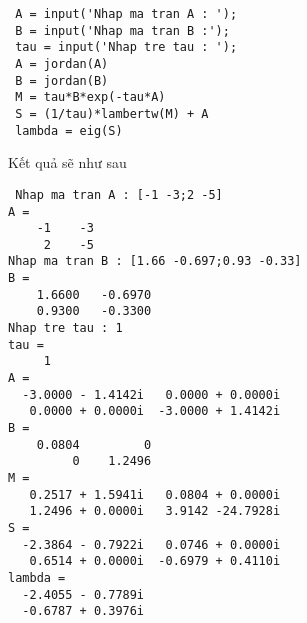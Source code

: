  \begin{verbatim}
 A = input('Nhap ma tran A : ');
 B = input('Nhap ma tran B :');
 tau = input('Nhap tre tau : ');
 A = jordan(A)
 B = jordan(B)
 M = tau*B*exp(-tau*A)
 S = (1/tau)*lambertw(M) + A
 lambda = eig(S)
 \end{verbatim}
 Kết quả sẽ như sau 
 \begin{verbatim}
 Nhap ma tran A : [-1 -3;2 -5]
A =
    -1    -3
     2    -5
Nhap ma tran B : [1.66 -0.697;0.93 -0.33]
B =
    1.6600   -0.6970
    0.9300   -0.3300
Nhap tre tau : 1
tau =
     1
A =
  -3.0000 - 1.4142i   0.0000 + 0.0000i
   0.0000 + 0.0000i  -3.0000 + 1.4142i
B =
    0.0804         0
         0    1.2496
M =
   0.2517 + 1.5941i   0.0804 + 0.0000i
   1.2496 + 0.0000i   3.9142 -24.7928i
S =
  -2.3864 - 0.7922i   0.0746 + 0.0000i
   0.6514 + 0.0000i  -0.6979 + 0.4110i
lambda =
  -2.4055 - 0.7789i
  -0.6787 + 0.3976i
 \end{verbatim}

 
 
 	 


 
 
 
 
 
 
 
 
 
 
 

